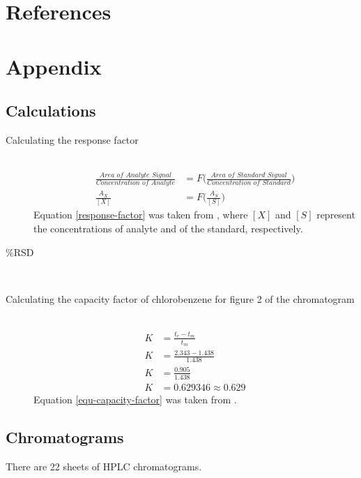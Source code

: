 \documentclass[a4paper, 12pt]{article}
\begin{document}

\section{References}
\printbibliography


\section{Appendix}

\subsection{Calculations}

\begin{description}
	\item[Calculating the response factor] \hfill \\
		\begin{equation} \label{response-factor}
		\begin{split}
			\frac{\textit{Area of Analyte Signal}}{\textit{Concentration of Analyte}} & = F\Bigg(\frac{\textit{Area of Standard Signal}}{\textit{Concentration of Standard}}\Bigg) \\
			\frac{A_X}{[X]} & = F\Bigg(\frac{A_S}{[S]}\Bigg)
		\end{split}
		\end{equation}
			Equation \ref{response-factor} was taken from \cite{harris}, where $[X]$ and $[S]$ represent the concentrations of analyte and of the standard, respectively.

	\item[$\%$RSD] \hfill \\

	\item[Calculating the capacity factor of chlorobenzene for figure 2 of the chromatogram] \hfill \\
		\begin{equation} \label{equ-capacity-factor}
			\begin{split}
				K & = \frac{t_r - t_m}{t_m} \\
				K & = \frac{2.343 - 1.438}{1.438} \\
				K & = \frac{0.905}{1.438} \\
				K & = 0.629346 \approx 0.629
			\end{split}
		\end{equation}
		Equation \ref{equ-capacity-factor} was taken from \cite{harris}.
\end{description}

\subsection{Chromatograms}
There are 22 sheets of HPLC chromatograms.

\end{document}
